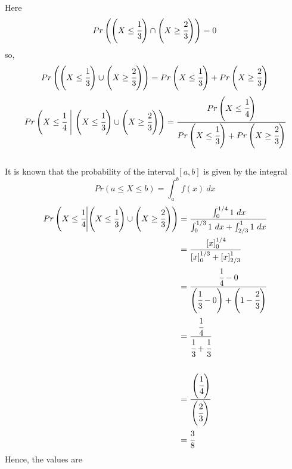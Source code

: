 \documentclass{article}
\begin{document}
\begin{enumerate}
\begin{enumerate}
        Here 
        \[ 
            Pr\left( \left( X \leq \cfrac{1}{3} \right) \cap \left( X \geq \cfrac{2}{3} \right) \right) = 0
        \]
        so,
        \[ 
            {Pr\left( \left(X \leq \cfrac{1}{3}\right) \cup \left(X \geq \cfrac{2}{3}\right) \right)} = Pr\left( X \leq \cfrac{1}{3} \right) + Pr\left( X \geq \cfrac{2}{3} \right)
        \]
        \[ 
            Pr\left( X \leq \cfrac{1}{4}\  \middle| \ \left( X \leq \cfrac{1}{3} \right) \cup \left( X \geq \cfrac{2}{3} \right) \right) = 
            \cfrac{Pr\left( X \leq \cfrac{1}{4} \right)}{Pr\left( X \leq \cfrac{1}{3} \right) + Pr\left( X \geq \cfrac{2}{3} \right)} 
        \]\\
        It is known that the probability of the interval \( [a,b] \) is given by the integral 
        \[ 
            Pr(a \leq X \leq b) = \int_{a}^{b} f(x) \ dx 
        \]
        \begin{align*} 
            Pr\left( X \leq \cfrac{1}{4} \middle| \left( X \leq \cfrac{1}{3} \right) \cup \left( X \geq \cfrac{2}{3} \right) \right) &= 
            \cfrac{\int_{0}^{1/4} 1 \ dx}{\int_{0}^{1/3} 1 \ dx + \int_{2/3}^{1} 1 \ dx} \\
            &= \cfrac{\left[ x \right]_{0}^{1/4}}{\left[ x \right]_{0}^{1/3} + \left[ x \right]_{2/3}^{1}}\\ 
            &= \cfrac{\cfrac{1}{4} - 0}{\left( \cfrac{1}{3} - 0 \right) + \left( 1 - \cfrac{2}{3} \right)} \\
            &= \cfrac{\cfrac{1}{4}}{\cfrac{1}{3} + \cfrac{1}{3}} \\\\
            &= \cfrac{\left(\cfrac{1}{4}\right)}{\left(\cfrac{2}{3}\right)} \\
            &= \cfrac{3}{8}\\ 
        \end{align*}
        Hence, the values are 


\end{enumerate}
\end{enumerate}
\end{document}

